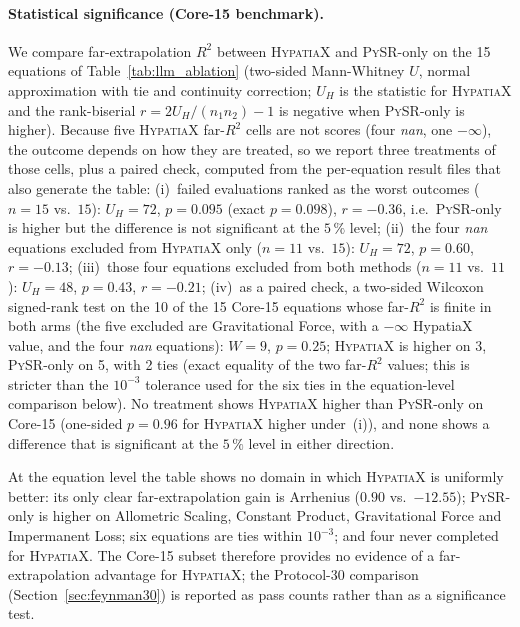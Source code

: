 \documentclass[twoside,11pt]{article}
\newcommand{\Rsq}{R^{2}}
\begin{document}
\paragraph{Statistical significance (Core-15 benchmark).}
We compare far-extrapolation $\Rsq$ between \textsc{HypatiaX} and \textsc{PySR}-only
on the 15 equations of Table~\ref{tab:llm_ablation} (two-sided Mann-Whitney $U$,
normal approximation with tie and continuity correction; $U_H$ is the statistic for
\textsc{HypatiaX} and the rank-biserial $r=2U_H/(n_1n_2)-1$ is negative when
\textsc{PySR}-only is higher). Because five \textsc{HypatiaX} far-$\Rsq$ cells are
not scores (four \textit{nan}, one $-\infty$), the outcome depends on how they are
treated, so we report three treatments of those cells, plus a paired check, computed from the per-equation result
files that also generate the table:
(i)~failed evaluations ranked as the worst outcomes ($n=15$ vs.\ $15$):
$U_H=72$, $p=0.095$ (exact $p=0.098$), $r=-0.36$, i.e.\ \textsc{PySR}-only is higher but the difference is not significant at the $5\,\%$ level;
(ii)~the four \textit{nan} equations excluded from \textsc{HypatiaX} only ($n=11$ vs.\ $15$):
$U_H=72$, $p=0.60$, $r=-0.13$;
(iii)~those four equations excluded from both methods ($n=11$ vs.\ $11$):
$U_H=48$, $p=0.43$, $r=-0.21$;
(iv)~as a paired check, a two-sided Wilcoxon signed-rank test on the 10 of the 15 Core-15 equations whose
far-$\Rsq$ is finite in both arms (the five excluded are Gravitational Force, with a $-\infty$ HypatiaX value, and the four
\textit{nan} equations): $W=9$, $p=0.25$; \textsc{HypatiaX} is higher on 3, \textsc{PySR}-only on 5, with 2 ties
(exact equality of the two far-$\Rsq$ values; this is stricter than the $10^{-3}$ tolerance used for the six ties in the equation-level comparison below).
No treatment shows \textsc{HypatiaX} higher than \textsc{PySR}-only on Core-15
(one-sided $p=0.96$ for \textsc{HypatiaX} higher under~(i)), and none shows a difference
that is significant at the $5\,\%$ level in either direction.

At the equation level the table shows no domain in which \textsc{HypatiaX} is
uniformly better: its only clear far-extrapolation gain is Arrhenius ($0.90$ vs.\ $-12.55$);
\textsc{PySR}-only is higher on Allometric Scaling, Constant Product, Gravitational
Force and Impermanent Loss; six equations are ties within $10^{-3}$; and four never completed
for \textsc{HypatiaX}.
The Core-15 subset therefore provides no evidence of a far-extrapolation advantage
for \textsc{HypatiaX}; the Protocol-30 comparison (Section~\ref{sec:feynman30}) is reported as pass counts
rather than as a significance test.
\end{document}
